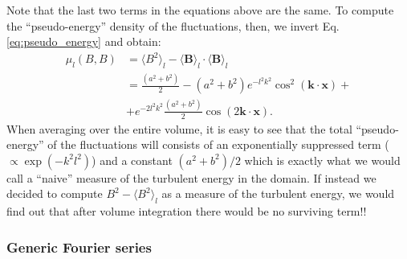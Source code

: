 \documentclass[]{article}
\begin{document}
%
Note that the last two terms in the equations above are the same. To compute the ``pseudo-energy'' density of the fluctuations, then, we invert Eq.\eqref{eq:pseudo_energy} and obtain:
%
\begin{align}
	\mu_l(B,B) &= \langle B^2 \rangle_l - \langle \bm B \rangle_l \cdot \langle \bm B \rangle_l  \\
	&= \frac{(a^2 + b^2)}{2}  - (a^2 + b^2) e^{- l^2 k^2} \cos^2 (\bm k \cdot \bm x) + \\
	&+ e^{- 2 l^2 k^2} \frac{(a^2 + b^2)}{2}  \cos (2 \bm k \cdot \bm x) .
\end{align}
%
When averaging over the entire volume, it is easy to see that the total ``pseudo-energy'' of the fluctuations will consists of an exponentially suppressed term ($\propto \exp(-k^2 l ^2)$) and a constant $(a^2 + b^2)/2$ which is exactly what we would call a ``naive'' measure of the turbulent energy in the domain.
If instead we decided to compute $B^2 - \langle B^2 \rangle_l$ as a measure of the turbulent energy, we would find out that after volume integration there would be no surviving term!!


\subsubsection{Generic Fourier series}
\end{document}
